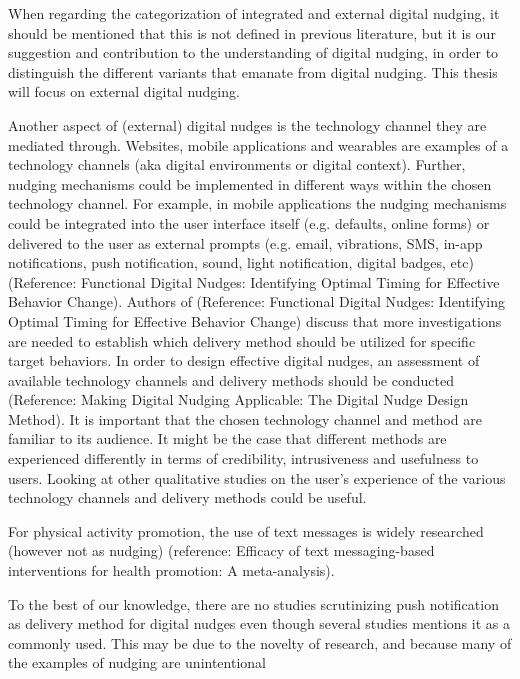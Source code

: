 When regarding the categorization of integrated and external digital nudging, it should be mentioned that this is not defined in previous literature, but it is our suggestion and contribution to the understanding of digital nudging, in order to distinguish the different variants that emanate from digital nudging. This thesis will focus on external digital nudging. 

\bigbreak
\bigbreak
\bigbreak

Another aspect of (external) digital nudges is the technology channel they are mediated through. Websites, mobile applications and wearables are examples of a technology channels (aka digital environments or digital context). Further, nudging mechanisms could be implemented in different ways within the chosen technology channel. For example, in mobile applications the nudging mechanisms could be integrated into the user interface itself (e.g. defaults, online forms) or delivered to the user as external prompts (e.g. email, vibrations, SMS, in-app notifications, push notification, sound, light notification, digital badges, etc) (Reference: Functional Digital Nudges: Identifying Optimal Timing for Effective Behavior Change). Authors of (Reference: Functional Digital Nudges: Identifying Optimal Timing for Effective Behavior Change) discuss that more investigations are needed to establish which delivery method should be utilized for specific target behaviors. 
In order to design effective digital nudges, an assessment of available technology channels and delivery methods should be conducted (Reference: Making Digital Nudging Applicable: The Digital Nudge Design Method). It is important that the chosen technology channel and method are familiar to its audience. It might be the case that different methods are experienced differently in terms of credibility, intrusiveness and usefulness to users. Looking at other qualitative studies on the user's experience of the various technology channels and delivery methods could be useful. 

For physical activity promotion, the use of text messages is widely researched (however not as nudging) (reference: Efficacy of text messaging-based interventions for health promotion: A meta-analysis). 

To the best of our knowledge, there are no studies scrutinizing push notification as delivery method for digital nudges even though several studies mentions it as a commonly used. This may be due to the novelty of research, and because many of the examples of nudging are unintentional

